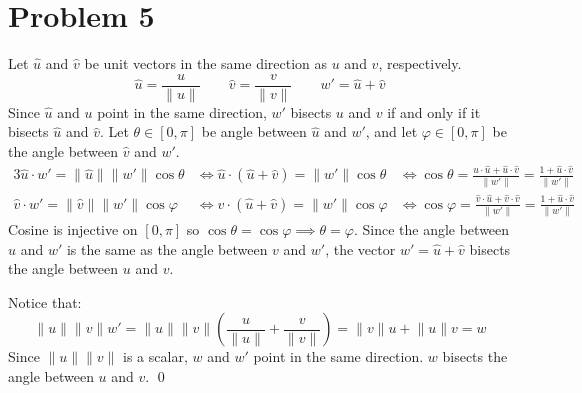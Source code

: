 \documentclass[preview, margin=0.6in]{standalone}
\newcommand*{\problem}[1]{\section*{Problem #1}}
\begin{document}
\problem{5}
Let $\hat u$ and $\hat v$ be unit vectors in the same direction as $u$ and $v$, respectively.
\begin{equation*}
    \hat u=\frac{u}{\lVert u \rVert } \qquad
    \hat v=\frac{v}{\lVert v \rVert } \qquad
	w'=\hat u+\hat v
\end{equation*}
Since $\hat u$ and $u$ point in the same direction, $w'$ bisects $u$ and $v$ if and only if it bisects $\hat u$ and $\hat v$. Let $\theta\in[0,\pi]$ be angle between $\hat u$ and $w'$, and let $\varphi\in[0,\pi]$ be the angle between $\hat v$ and $w'$.
\begin{alignat*}{3}
	\hat u\cdot w'
	=\lVert \hat u \rVert \lVert w' \rVert \cos\theta
	&\iff \hat u\cdot(\hat u+\hat v)
	=\lVert w' \rVert \cos\theta
	&\iff \cos\theta
	=\frac{\hat u\cdot \hat u+\hat u\cdot\hat v}{\lVert w' \rVert }
	=\frac{1+\hat u\cdot\hat v}{\lVert w' \rVert } \\
	\hat v\cdot w'
	=\lVert \hat v \rVert \lVert w' \rVert \cos\varphi
	&\iff \hat v\cdot(\hat u+\hat v)
	=\lVert w' \rVert \cos\varphi
	&\iff \cos\varphi
	=\frac{\hat v\cdot \hat u+\hat v\cdot\hat v}{\lVert w' \rVert }
	=\frac{1+\hat u\cdot\hat v}{\lVert w' \rVert }
\end{alignat*}
Cosine is injective on $[0,\pi]$ so $\cos\theta=\cos\varphi\implies \theta=\varphi$. Since the angle between $u$ and $w'$ is the same as the angle between $v$ and $w'$, the vector $w'=\hat u+\hat v$ bisects the angle between $u$ and $v$.

Notice that:
\begin{equation*}
    \lVert u \rVert \lVert v \rVert w'
	=\lVert u \rVert \lVert v \rVert \left( \frac{u}{\lVert u \rVert}+\frac{v}{\lVert v \rVert } \right)
	=\lVert v \rVert u+\lVert u \rVert v
	=w
\end{equation*}
Since $\lVert u \rVert \lVert v \rVert $ is a scalar, $w$ and $w'$ point in the same direction. $w$ bisects the angle between $u$ and $v$. \qed
\end{document}
